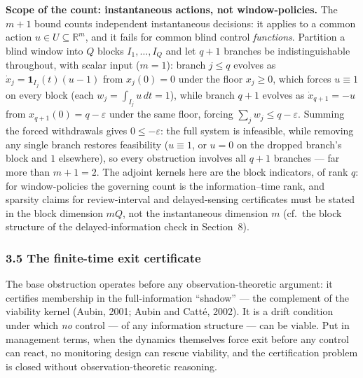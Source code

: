 \documentclass[10pt,twocolumn]{article}
\theoremstyle{definition}
\begin{document}
\textbf{Scope of the count: instantaneous actions, not window-policies.}
The \(m+1\) bound counts independent instantaneous decisions: it applies to a
common action \(u \in U \subseteq \mathbb{R}^m\), and it fails for common blind
control \emph{functions}. Partition a blind window into \(Q\) blocks
\(I_1, \dots, I_Q\) and let \(q + 1\) branches be indistinguishable throughout,
with scalar input (\(m = 1\)): branch \(j \le q\) evolves as
\(\dot x_j = \mathbf{1}_{I_j}(t)(u - 1)\) from \(x_j(0) = 0\) under the floor
\(x_j \ge 0\), which forces \(u \equiv 1\) on every block (each
\(w_j = \int_{I_j} u \, dt = 1\)), while branch \(q+1\) evolves as
\(\dot x_{q+1} = -u\) from \(x_{q+1}(0) = q - \varepsilon\) under the same
floor, forcing \(\sum_j w_j \le q - \varepsilon\). Summing the forced
withdrawals gives \(0 \le -\varepsilon\): the full system is infeasible, while
removing any single branch restores feasibility (\(u \equiv 1\), or \(u = 0\)
on the dropped branch's block and \(1\) elsewhere), so every obstruction
involves all \(q+1\) branches --- far more than \(m + 1 = 2\). The adjoint
kernels here are the block indicators, of rank \(q\): for window-policies the
governing count is the information--time rank, and sparsity claims for
review-interval and delayed-sensing certificates must be stated in the block
dimension \(mQ\), not the instantaneous dimension \(m\) (cf.\ the block
structure of the delayed-information check in Section~8).

\subsubsection{3.5 The finite-time exit
certificate}\label{calc-the-finite-time-exit-certificate}

The base obstruction operates before any observation-theoretic argument: it
certifies membership in the full-information ``shadow'' --- the
complement of the viability kernel (Aubin, 2001; Aubin and
Catt\'e, 2002).
It is a drift condition under which \emph{no} control --- of any
information structure --- can be viable. Put in management terms, when the dynamics themselves force exit before any control can react, no monitoring design can rescue viability, and the certification problem is closed without observation-theoretic reasoning.
\end{document}
